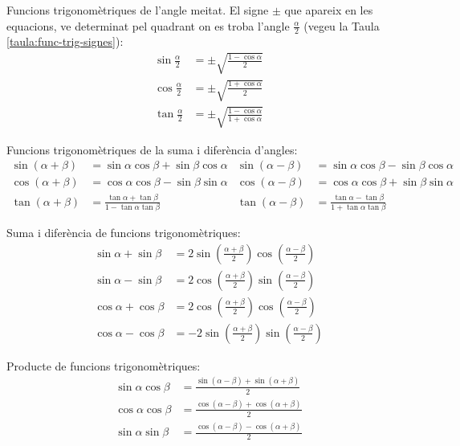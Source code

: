 Funcions trigonom\`{e}triques de l'angle meitat. El signe $\pm$ que
apareix en les equacions, ve determinat pel quadrant on es troba
l'angle $\frac{\alpha}{2}$ (vegeu la Taula
\vref{taula:func-trig-signes}):
\begin{subequations}
\begin{align}
    \sin \frac{\alpha}{2} &= \pm \sqrt{\frac{1-\cos\alpha}{2}}\\[1ex]
    \cos \frac{\alpha}{2} &= \pm \sqrt{\frac{1+\cos\alpha}{2}}\\[1ex]
    \tan \frac{\alpha}{2} &= \pm \sqrt{\frac{1-\cos\alpha}{1+\cos\alpha}}
\end{align}
\end{subequations}


Funcions trigonom\`{e}triques de la suma i difer\`{e}ncia d'angles:
\begin{subequations}
\begin{align}
    \sin(\alpha+\beta) &= \sin\alpha \cos\beta + \sin\beta\cos\alpha &
    \sin(\alpha-\beta) &= \sin\alpha \cos\beta - \sin\beta\cos\alpha\\[1ex]
    \cos(\alpha+\beta) &= \cos\alpha \cos\beta - \sin\beta\sin\alpha &
    \cos(\alpha-\beta) &= \cos\alpha \cos\beta + \sin\beta\sin\alpha\\[1ex]
    \tan(\alpha+\beta) &=\frac{\tan\alpha+\tan\beta}{1-\tan\alpha\tan\beta} &
    \tan(\alpha-\beta)
    &=\frac{\tan\alpha-\tan\beta}{1+\tan\alpha\tan\beta}
\end{align}
\end{subequations}

Suma i difer\`{e}ncia de funcions trigonom\`{e}triques:
\begin{subequations}
\begin{align}
    \sin\alpha+\sin\beta &= 2 \sin\left(\frac{\alpha+\beta}{2}\right)
    \cos\left(\frac{\alpha-\beta}{2}\right)\\[1ex]
    \sin\alpha-\sin\beta &= 2 \cos\left(\frac{\alpha+\beta}{2}\right)
    \sin\left(\frac{\alpha-\beta}{2}\right)\\[1ex]
    \cos\alpha+\cos\beta &= 2 \cos\left(\frac{\alpha+\beta}{2}\right)
    \cos\left(\frac{\alpha-\beta}{2}\right)\\[1ex]
    \cos\alpha-\cos\beta &= -2 \sin\left(\frac{\alpha+\beta}{2}\right)
    \sin\left(\frac{\alpha-\beta}{2}\right)
\end{align}
\end{subequations}

Producte de funcions trigonom\`{e}triques:
\begin{subequations}
\begin{align}
    \sin\alpha \cos\beta &=
    \frac{\sin(\alpha-\beta)+\sin(\alpha+\beta)}{2}\\[1ex]
    \cos\alpha \cos\beta &=
    \frac{\cos(\alpha-\beta)+\cos(\alpha+\beta)}{2}\\[1ex]
    \sin\alpha \sin\beta &=
    \frac{\cos(\alpha-\beta)-\cos(\alpha+\beta)}{2}
\end{align}
\end{subequations}

